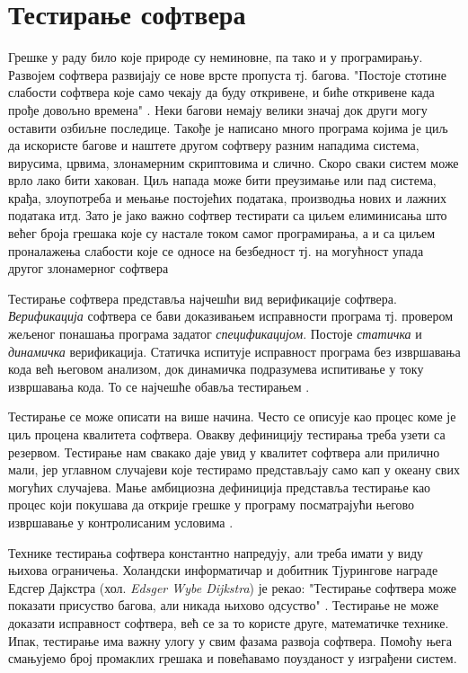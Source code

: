 \documentclass[12pt,oneside]{memoir}
\begin{document}
\chapter{Тестирање софтвера}

Грешке у раду било које природе су неминовне, па тако и у програмирању. Развојем софтвера развијају се нове врсте пропуста тј. багова. "Постоје стотине слабости софтвера које само чекају да буду откривене, и биће откривене када прође довољно времена" \cite{fuzzing}. Неки багови немају велики значај док други могу оставити озбиљне последице. Такође је написано много програма којима је циљ да искористе багове и наштете другом софтверу разним нападима система, вирусима, црвима, злонамерним скриптовима и слично. Скоро сваки систем може врло лако бити хакован. Циљ напада може бити преузимање или пад система, крађа, злоупотреба и мењање постојећих података, производња нових и лажних података итд. Зато је јако важно софтвер тестирати са циљем елиминисања што већег броја грешака које су настале током самог програмирања, а и са циљем проналажења слабости које се односе на безбедност тј. на могућност упада другог злонамерног софтвера \cite{fuzzing, bezbMalkov}

Тестирање софтвера представља најчешћи вид верификације софтвера. \textit{Верификација} софтвера се бави доказивањем исправности програма тј. провером жељеног понашања програма задатог \textit{спецификацијом}. Постоје \textit{статичка} и \textit{динамичка} верификација. Статичка испитује исправност програма без извршавања кода већ његовом анализом, док динамичка подразумева испитивање у току извршавања кода. То се најчешће обавља тестирањем \cite{milenaDokt}. 

Тестирање се може описати на више начина. Често се описује као процес коме је циљ процена квалитета софтвера. Овакву дефиницију тестирања треба узети са резервом. Тестирање нам свакако даје увид у квалитет софтвера али прилично мали, јер углавном случајеви које тестирамо представљају само кап у океану свих могућих случајева. Мање амбициозна дефиниција представља тестирање као процес који покушава да открије грешке у програму посматрајући његово извршавање у контролисаним условима \cite{testPrinc}.

Технике тестирања софтвера константно напредују, али треба имати у виду њихова ограничења. Холандски информатичар и добитник Тјурингове награде Едсгер Дајкстра (хол. \textit{Edsger Wybe Dijkstra}) је рекао: "Тестирање софтвера може показати присуство багова, али никада њихово одсуство" \cite{testPrinc}. Тестирање не може доказати исправност софтвера, већ се за то користе друге, математичке технике. Ипак, тестирање има важну улогу у свим фазама развоја софтвера. Помоћу њега смањујемо број промаклих грешака и повећавамо поузданост у изграђени систем.
\end{document}
